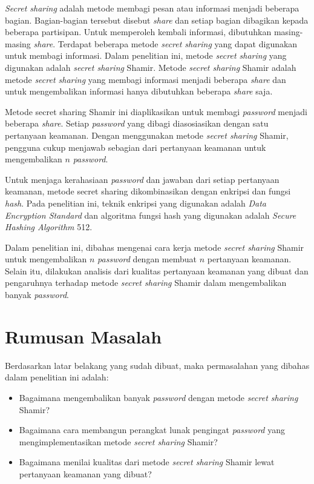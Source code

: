 \textit{Secret sharing} adalah metode membagi pesan atau informasi menjadi beberapa bagian. Bagian-bagian tersebut disebut \textit{share} dan setiap bagian dibagikan kepada beberapa partisipan. Untuk memperoleh kembali informasi, dibutuhkan masing-masing \textit{share}. Terdapat beberapa metode \textit{secret sharing} yang dapat digunakan untuk membagi informasi. Dalam penelitian ini, metode \textit{secret sharing} yang digunakan adalah \textit{secret sharing} Shamir. Metode \textit{secret sharing} Shamir adalah metode \textit{secret sharing} yang membagi informasi menjadi beberapa \textit{share} dan untuk mengembalikan informasi hanya dibutuhkan beberapa \textit{share} saja.

Metode secret sharing Shamir ini diaplikasikan untuk membagi \textit{password} menjadi beberapa \textit{share}. Setiap \textit{password} yang dibagi diasosiasikan dengan satu pertanyaan keamanan. Dengan menggunakan metode \textit{secret sharing} Shamir, pengguna cukup menjawab sebagian dari pertanyaan keamanan untuk mengembalikan $n$ \textit{password}.

Untuk menjaga kerahasiaan \textit{password} dan jawaban dari setiap pertanyaan keamanan, metode secret sharing dikombinasikan dengan enkripsi dan fungsi \textit{hash}. Pada penelitian ini, teknik enkripsi yang digunakan adalah \textit{Data Encryption Standard} dan algoritma fungsi hash yang digunakan adalah \textit{Secure Hashing Algorithm} 512.

Dalam penelitian ini, dibahas mengenai cara kerja metode \textit{secret sharing} Shamir untuk mengembalikan $n$ \textit{password} dengan membuat $n$ pertanyaan keamanan. Selain itu, dilakukan analisis dari kualitas pertanyaan keamanan yang dibuat dan pengaruhnya terhadap metode \textit{secret sharing} Shamir dalam mengembalikan banyak \textit{password}.

\section{Rumusan Masalah}
\label{sec:rumusanmasalah}

Berdasarkan latar belakang yang sudah dibuat, maka permasalahan yang dibahas dalam penelitian ini adalah:
\begin{itemize}
	\item Bagaimana mengembalikan banyak \textit{password} dengan metode \textit{secret sharing} Shamir?
	\item Bagaimana cara membangun perangkat lunak pengingat \textit{password} yang mengimplementasikan metode \textit{secret sharing} Shamir?
	\item Bagaimana menilai kualitas dari metode \textit{secret sharing} Shamir lewat pertanyaan keamanan yang dibuat?
\end{itemize}

